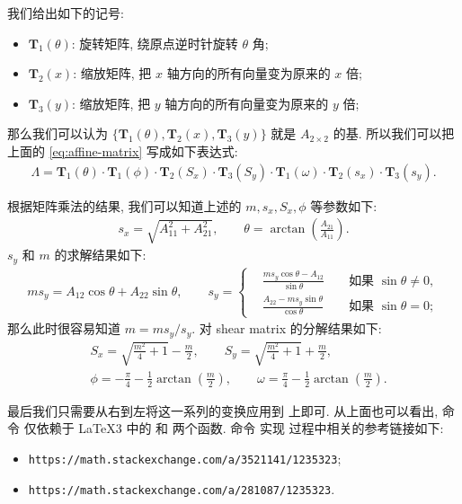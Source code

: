 \documentclass[
  hyper, lang=cn, 
  class=l3dox, 
]{../../zlatex/code/ztex}
\begin{document}
我们给出如下的记号:
\begin{itemize}
  \item $\mathbf{T}_1(\theta)$: 旋转矩阵, 绕原点逆时针旋转 $\theta$ 角;
  \item $\mathbf{T}_2(x)$: 缩放矩阵, 把 $x$ 轴方向的所有向量变为原来的 $x$ 倍;
  \item $\mathbf{T}_3(y)$: 缩放矩阵, 把 $y$ 轴方向的所有向量变为原来的 $y$ 倍;
\end{itemize}

那么我们可以认为 $\{\mathbf{T}_1(\theta), \mathbf{T}_2(x), \mathbf{T}_3(y)\}$ 就是 $A_{2\times 2}$ 的基.
所以我们可以把上面的 \cref{eq:affine-matrix} 写成如下表达式:
\begin{align}\label{eq:affine-matrix-res}
  \Lambda = \mathbf{T}_1(\theta) \cdot \mathbf{T}_1(\phi)
  \cdot \mathbf{T}_2(S_x)\cdot \mathbf{T}_3(S_y)
  \cdot \mathbf{T}_1(\omega)\cdot \mathbf{T}_2(s_x)\cdot \mathbf{T}_3(s_y).
\end{align}

根据矩阵乘法的结果, 我们可以知道上述的 $m, s_x, S_x, \phi$ 等参数如下:
\begin{align*}
  s_x = \sqrt{A_{11}^2 + A_{21}^2},\qquad \theta = \arctan\left( \frac{A_{21}}{A_{11}} \right).
\end{align*}
$s_y$ 和 $m$ 的求解结果如下:
\begin{align*}
  ms_y = A_{12}\cos\theta + A_{22}\sin\theta,\qquad
  s_y = \left\{\begin{aligned}
    & \frac{m s_y\cos\theta - A_{12}}{\sin\theta} && \text{ 如果 } \sin\theta \neq 0, \\
    & \frac{A_{22} - m s_y\sin\theta}{\cos\theta} && \text{ 如果 } \sin\theta = 0;
  \end{aligned}\right. 
\end{align*}
那么此时很容易知道 $m = ms_y / s_y$. 对 shear matrix 的分解结果如下:
\begin{align*}
  & S_x = \sqrt{\frac{m^2}4+1} - \frac{m}2, \qquad
    S_y = \sqrt{\frac{m^2}4+1} + \frac{m}2, \\
  & \phi = -\frac{\pi}{4} - \frac{1}{2}\arctan(\frac{m}2), \qquad
    \omega = \frac{\pi}{4} - \frac{1}{2}\arctan(\frac{m}2).
\end{align*}

最后我们只需要从右到左将这一系列的变换应用到  上即可. 从上面也可以看出, 命令  
仅依赖于 \LaTeX3 中的  和  两个函数. 命令  实现
过程中相关的参考链接如下:
\begin{itemize}
  \item \texttt{https://math.stackexchange.com/a/3521141/1235323};
  \item \texttt{https://math.stackexchange.com/a/281087/1235323}.
\end{itemize}
\end{document}
